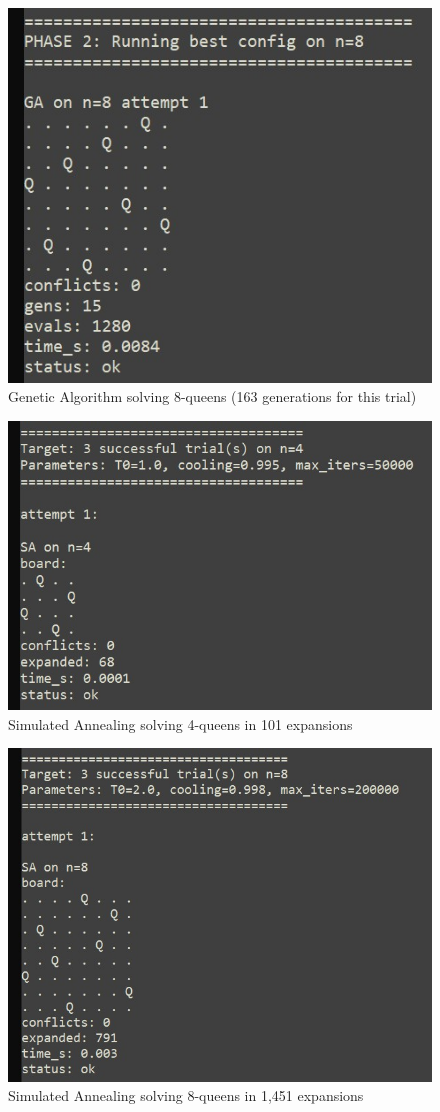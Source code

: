 \documentclass[letterpaper]{article}
\begin{document}
\begin{figure}[h]
\centering
\includegraphics[width=0.85\columnwidth]{queens_ga_n8.jpg}
\caption{Genetic Algorithm solving 8-queens (163 generations for this trial)}
\end{figure}

\begin{figure}[h]
\centering
\includegraphics[width=0.85\columnwidth]{queens_sa_n4.jpg}
\caption{Simulated Annealing solving 4-queens in 101 expansions}
\end{figure}

\begin{figure}[h]
\centering
\includegraphics[width=0.85\columnwidth]{queens_sa_n8.jpg}
\caption{Simulated Annealing solving 8-queens in 1,451 expansions}
\end{figure}
\end{document}
